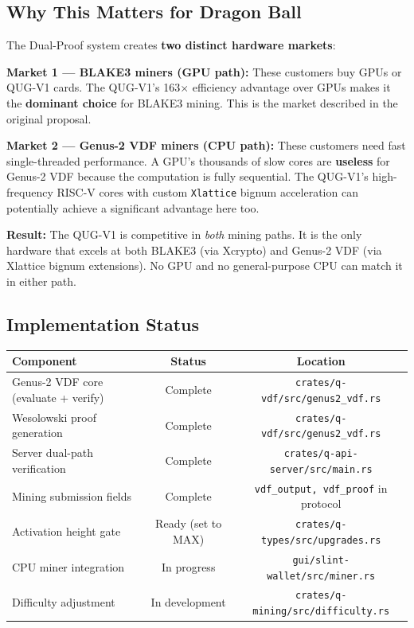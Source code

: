 \documentclass[11pt,a4paper]{article}
\begin{document}
\subsection{Why This Matters for Dragon Ball}

\begin{successbox}
The Dual-Proof system creates \textbf{two distinct hardware markets}:

\textbf{Market 1 --- BLAKE3 miners (GPU path):} These customers buy GPUs or QUG-V1 cards. The QUG-V1's 163$\times$ efficiency advantage over GPUs makes it the \textbf{dominant choice} for BLAKE3 mining. This is the market described in the original proposal.

\textbf{Market 2 --- Genus-2 VDF miners (CPU path):} These customers need fast single-threaded performance. A GPU's thousands of slow cores are \textbf{useless} for Genus-2 VDF because the computation is fully sequential. The QUG-V1's high-frequency RISC-V cores with custom \texttt{Xlattice} bignum acceleration can potentially achieve a significant advantage here too.

\textbf{Result:} The QUG-V1 is competitive in \textit{both} mining paths. It is the only hardware that excels at both BLAKE3 (via Xcrypto) and Genus-2 VDF (via Xlattice bignum extensions). No GPU and no general-purpose CPU can match it in either path.
\end{successbox}

\subsection{Implementation Status}

\begin{center}
\begin{tabular}{@{}lcc@{}}
\toprule
\textbf{Component} & \textbf{Status} & \textbf{Location} \\
\midrule
Genus-2 VDF core (evaluate + verify) & Complete & \texttt{crates/q-vdf/src/genus2\_vdf.rs} \\
Wesolowski proof generation & Complete & \texttt{crates/q-vdf/src/genus2\_vdf.rs} \\
Server dual-path verification & Complete & \texttt{crates/q-api-server/src/main.rs} \\
Mining submission fields & Complete & \texttt{vdf\_output, vdf\_proof} in protocol \\
Activation height gate & Ready (set to MAX) & \texttt{crates/q-types/src/upgrades.rs} \\
CPU miner integration & In progress & \texttt{gui/slint-wallet/src/miner.rs} \\
Difficulty adjustment & In development & \texttt{crates/q-mining/src/difficulty.rs} \\
\bottomrule
\end{tabular}
\end{center}
\end{document}
